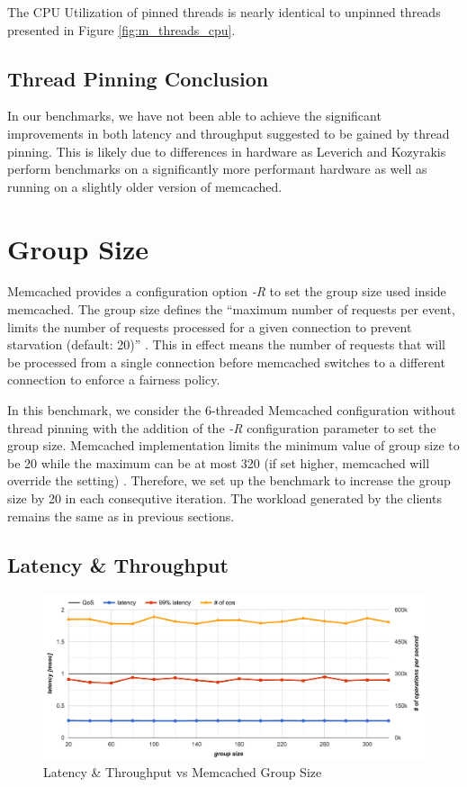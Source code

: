 The CPU Utilization of pinned threads is nearly identical to unpinned threads presented in Figure \ref{fig:m_threads_cpu}.

\subsection{Thread Pinning Conclusion}

In our benchmarks, we have not been able to achieve the significant improvements in both latency and throughput suggested to be gained by thread pinning. This is likely due to differences in hardware as Leverich and Kozyrakis \cite{leverich2014reconciling} perform benchmarks on a significantly more performant hardware as well as running on a slightly older version of memcached.


\section{Group Size}
Memcached provides a configuration option \textit{-R} to set the group size used inside memcached. The group size defines the ``maximum number of requests per event, limits the number of requests processed for a given connection to prevent starvation (default: 20)'' \cite{interactive2006memcached}. This in effect means the number of requests that will be processed from a single connection before memcached switches to a different connection to enforce a fairness policy.

In this benchmark, we consider the 6-threaded Memcached configuration without thread pinning with the addition of the \textit{-R} configuration parameter to set the group size. Memcached implementation limits the minimum value of group size to be 20 while the maximum can be at most 320 (if set higher, memcached will override the setting) \cite{blake54does}. Therefore, we set up the benchmark to increase the group size by 20 in each consequtive iteration. The workload generated by the clients remains the same as in previous sections.

\subsection{Latency \& Throughput}

\begin{figure}[h]
    \includegraphics[width=\textwidth]{./res2/m_group_size_latency.png}
    \caption{Latency \& Throughput vs Memcached Group Size }
    \label{fig:m_group_size_latency}
\end{figure}

